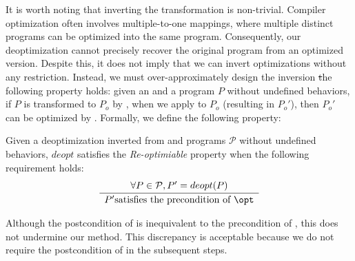 It is worth noting that inverting the transformation is non-trivial.
Compiler optimization often involves multiple-to-one mappings, where multiple distinct programs can be optimized into the same program. Consequently, our deoptimization cannot precisely recover the original program from an optimized version. Despite this, it does not imply that we can invert optimizations without any restriction. 
Instead, we must over-approximately design the inversion \st the following property holds: given an \opt and a program $P$ without undefined behaviors, if $P$ is transformed to $P_o$ by \opt, when we apply \deopt to $P_o$ (resulting in $P_o'$), then $P_o'$ can be optimized by \opt. 
Formally, we define the following property:
\begin{definition}[Re-optimiable]
	\label{def:reopt}
	Given a deoptimization \deopt inverted from \opt and programs $\mathcal{P}$ without undefined behaviors,  $deopt$ satisfies the \textit{Re-optimiable} property when the following requirement holds:
	$$
    \frac
    {
    \begin{array}{c}
        \forall P \in \mathcal{P}, P' = deopt(P)
    \end{array}
    }
    {
    \begin{array}{c}
        P' \text{satisfies the precondition of }\opt \\
    \end{array}
    }
	$$
\end{definition}
Although the postcondition of \deopt is inequivalent to the precondition of \opt, this does not undermine our method. This discrepancy is acceptable because we do not require the postcondition of \deopt in the subsequent steps.



